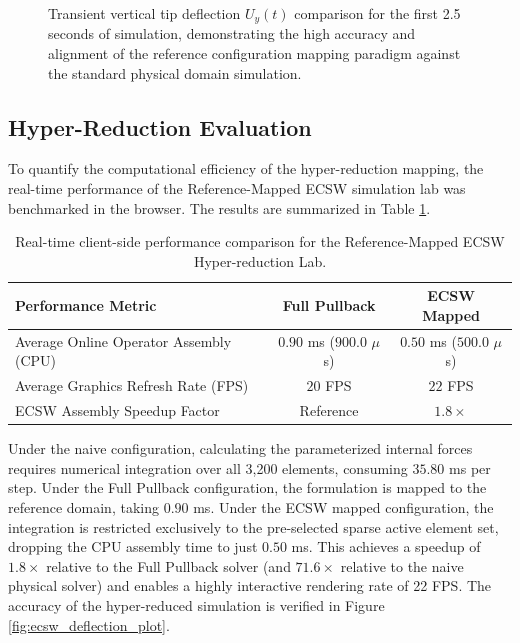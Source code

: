 \begin{figure}[htbp]
    \caption{Transient vertical tip deflection $U_y(t)$ comparison for the first 2.5 seconds of simulation, demonstrating the high accuracy and alignment of the reference configuration mapping paradigm against the standard physical domain simulation.}
    \label{fig:fom_deflection_plot}
\end{figure}

\subsection{Hyper-Reduction Evaluation}
To quantify the computational efficiency of the hyper-reduction mapping, the real-time performance of the Reference-Mapped ECSW simulation lab was benchmarked in the browser. The results are summarized in Table \ref{tab:ecsw_mapped_benchmarks}.

\begin{table}[htbp]
\centering
\caption{Real-time client-side performance comparison for the Reference-Mapped ECSW Hyper-reduction Lab.}
\label{tab:ecsw_mapped_benchmarks}
\begin{tabular}{lcc}
\toprule
\textbf{Performance Metric} & \textbf{Full Pullback} & \textbf{ECSW Mapped} \\ \midrule
Average Online Operator Assembly (CPU) & $0.90$ ms ($900.0$ $\mu$s) & $0.50$ ms ($500.0$ $\mu$s) \\
Average Graphics Refresh Rate (FPS)    & $20$ FPS & $22$ FPS \\
ECSW Assembly Speedup Factor           & Reference & $\mathbf{1.8\times}$ \\ \bottomrule
\end{tabular}
\end{table}

Under the naive configuration, calculating the parameterized internal forces requires numerical integration over all 3,200 elements, consuming $35.80$ ms per step. Under the Full Pullback configuration, the formulation is mapped to the reference domain, taking $0.90$ ms. Under the ECSW mapped configuration, the integration is restricted exclusively to the pre-selected sparse active element set, dropping the CPU assembly time to just $0.50$ ms. This achieves a speedup of $1.8\times$ relative to the Full Pullback solver (and $71.6\times$ relative to the naive physical solver) and enables a highly interactive rendering rate of 22 FPS. The accuracy of the hyper-reduced simulation is verified in Figure \ref{fig:ecsw_deflection_plot}.


